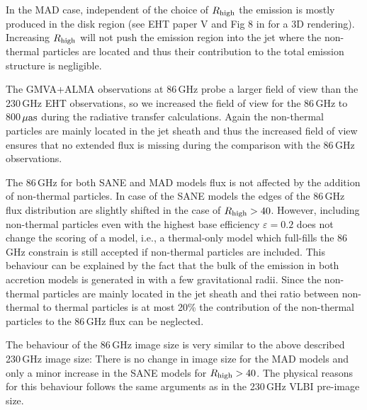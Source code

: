 
In the MAD case, independent of the choice of $R_\mathrm{high}$ the emission is mostly produced in the disk region (see EHT paper V and Fig 8 in \citet{Wong_2022} for a 3D rendering). Increasing $R_\mathrm{high}$ will not push the emission region into the jet where the non-thermal particles are located and thus their contribution to the total emission structure is negligible.


The GMVA+ALMA observations at 86\,GHz \cite{2021ApJ...915...99I} probe a larger field of view than the 230\,GHz EHT observations, so we increased the field of view for the 86\,GHz to 800\,$\rm{\mu as}$ during the radiative transfer calculations. Again the non-thermal particles are mainly located in the jet sheath and thus the increased field of view ensures that no extended flux is missing during the comparison with the 86\,GHz observations.

The 86\,GHz for both SANE and MAD models flux is not affected by the addition of non-thermal particles. In case of the SANE models the edges of the 86\,GHz flux distribution are slightly shifted in the case of $R_\mathrm{high}>40$. However, including non-thermal particles even with the highest base efficiency $\varepsilon=0.2$ does not change the scoring of a model, i.e., a thermal-only model which full-fills the 86\,GHz constrain is still accepted if non-thermal particles are included. This behaviour can be explained by the fact that the bulk of the emission in both accretion models is generated in with a few gravitational radii. Since the non-thermal particles are mainly located in the jet sheath and thei ratio between non-thermal to thermal particles is at most 20\% the contribution of the non-thermal particles to the 86\,GHz flux can be neglected.


The behaviour of the 86\,GHz image size is very similar to the above described 230\,GHz image size: There is no change in image size for the MAD models and only a minor increase in the SANE models for $R_\mathrm{high}>40$. The physical reasons for this behaviour follows the same arguments as in the 230\,GHz VLBI pre-image size.

